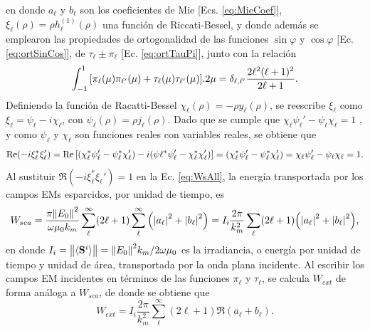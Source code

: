 en donde $a_\ell$ y $b_\ell$ son los coeficientes de Mie [Ecs.  \eqref{eq:MieCoef}], $\xi_\ell(\rho) = \rho h_\ell^{(1)}(\rho)$ una función de Riccati-Bessel, y donde además se emplearon las propiedades de ortogonalidad de las funciones $\sin\varphi$ y $\cos\varphi$ [Ec. \eqref{eq:ortSinCos}], de $\tau_\ell\pm\pi_\ell$ [Ec. \eqref{eq:ortTauPi}], junto con la relación \cite{bohren1998absorption}
	\begin{equation*}
	 \int_{-1}^{1}\qty[\pi_\ell(\mu)\pi_{\ell'}(\mu) + \tau_\ell(\mu)\tau_{\ell'}(\mu)].2\mu
 			= \delta_{\ell,\ell'} \frac{2\ell^2(\ell+1)^2}{2\ell+1}.
	 \end{equation*} 
Definiendo la función de Racatti-Bessel $\chi_\ell (\rho) = -\rho y_\ell(\rho)$, se reescribe $\xi_\ell$ como $\xi_\ell= \psi_\ell-i\chi_\ell$, con $\psi_\ell(\rho) = \rho j_\ell(\rho)$. Dado que se cumple que $\chi_\ell\psi_\ell'-\psi_\ell\chi_\ell = 1$ \cite{bohren1998absorption}, y como $\psi_\ell$ y $\chi_\ell$ son funciones reales con variables reales, se obtiene que
\begin{equation*}
\Re(-i\xi_\ell^*\xi_\ell')=\Re\qty[(\chi_\ell^*\psi_\ell'-\psi_\ell^*\chi_\ell')
						-i(\psi\ell^*\psi_\ell'-\chi_\ell^*\chi_\ell') ] 
						= (\chi_\ell^*\psi_\ell'-\psi_\ell^*\chi_\ell') 
						= \chi_\ell\psi_\ell'-\psi_\ell\chi_\ell = 1.
\end{equation*}
Al sustituir $\Re(-i\xi_\ell^*\xi_\ell') = 1$ en la Ec. \eqref{eq:WsAll}, la energía transportada por los campos EMs esparcidos, por unidad de tiempo, es
\begin{equation}
W_{sca} = \frac{\pi\norm{E_0}^2}{\omega\mu_0 k_m}
		\sum_\ell^\infty (2\ell+1) \sum_\ell^\infty\qty(\abs{a_\ell}^2+\abs{b_\ell}^2) = I_i \frac{2\pi}{k_m^2}  \sum_\ell (2\ell+1) \qty(\abs{a_\ell}^2+\abs{b_\ell}^2),
\end{equation}
en donde $I_i = \norm{\langle\vb{S}^i\rangle} = \norm{E_0}^2k_m/2\omega\mu_0$ es la irradiancia, o energía por unidad de tiempo y unidad de área, transportada por la onda plana incidente. Al escribir los campos EM incidentes en términos de las funciones $\pi_\ell$ y $\tau_\ell$, se calcula $W_{ext}$ de forma análoga a $W_{sca}$, de donde se obtiene que
\begin{equation}
W_{ext} = I_i \frac{2\pi}{k_m^2}  \sum_\ell^\infty (2\ell+1) \Re(a_\ell + b_\ell).
\end{equation}

